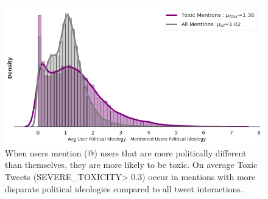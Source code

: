 \begin{figure}
    \centering
\begin{minipage}[l]{0.6\textwidth}
\includegraphics[width=1\columnwidth]{figures/all_vs_toxic_political_mentions.png} 
\end{minipage}
\begin{minipage}[l]{0.33\textwidth}
\caption{ When users mention (@) users that are more politically different than themselves, they are more likely to be toxic. On average Toxic Tweets  (SEVERE\_TOXICITY> 0.3) occur in mentions with more disparate political ideologies compared to all tweet interactions.  \label{fig:politican-diff-toxicity}}
\end{minipage}
\end{figure}



